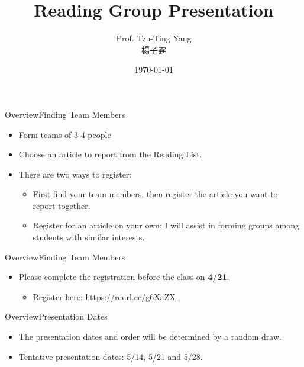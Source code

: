 \documentclass[hyperref={pdfpagelabels=false,hidelinks}]{beamer}
\title[]  
{Reading Group Presentation}
\author 
{Prof. Tzu-Ting Yang  \\ 楊子霆}
\institute{Institute of Economics, Academia Sinica  \\ 中央研究院經濟研究所}
\date
{\today}
\begin{document}
\begin{frame}{}
 \titlepage
\end{frame}


\begin{frame}{Overview}{Finding Team Members}
	\begin{itemize}
		\item Form teams of 3-4 people
				\vspace{0.2cm}
		\item Choose an article to report from the Reading List. 
						\vspace{0.2cm}
		\item There are two ways to register:
		\begin{itemize}
			\item First find your team members, then register the article you want to report together.
							\vspace{0.2cm}
			\item Register for an article on your own; I will assist in forming groups among students with similar interests.
							\vspace{0.2cm}
		\end{itemize}
	
		
		
	\end{itemize}
\end{frame}




\begin{frame}{Overview}{Finding Team Members}
	\begin{itemize}
	
		\item Please complete the registration before the class on \textbf{4/21}.
					\vspace{0.2cm}
				\begin{itemize}
		
		\item Register here: \url{https://reurl.cc/g6XaZX}
		
				\end{itemize}
	\end{itemize}
\end{frame}


\begin{frame}{Overview}{Presentation Dates}
	\begin{itemize}
		\item The presentation dates and order will be determined by a random draw.
									\vspace{0.2cm}
		\item Tentative presentation dates: 5/14, 5/21 and 5/28.
	\end{itemize}
\end{frame}
\end{document}
